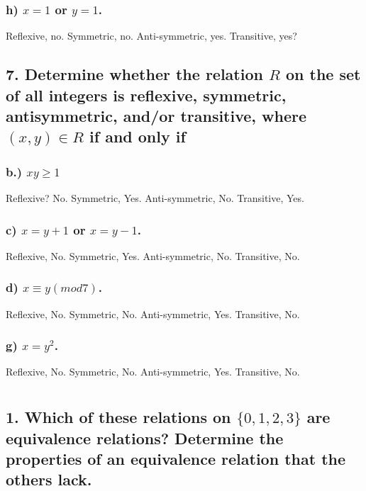 \documentclass[11pt, oneside]{article} %
\numberwithin{equation}{section} %
\numberwithin{figure}{section} %
\numberwithin{table}{section} %
\begin{document}
\subsubsection{h) $x=1$ or $y=1$.}
Reflexive, no. Symmetric, no. Anti-symmetric, yes. Transitive,  yes?

\subsection{7. Determine whether the relation $R$ on the set of all integers is reflexive, symmetric, antisymmetric, and/or transitive, where $(x,y) \in R$ if and only if}
\subsubsection{b.) $xy \geq 1$}
Reflexive? No. Symmetric, Yes. Anti-symmetric, No. Transitive, Yes.
\subsubsection{c) $x=y+1$ or $x=y−1$.}
Reflexive, No. Symmetric, Yes. Anti-symmetric, No. Transitive, No.
\subsubsection{d) $x \equiv y(mod 7)$.}
Reflexive, No. Symmetric, No. Anti-symmetric, Yes. Transitive, No.
\subsubsection{g) $x=y^2$.}
Reflexive, No. Symmetric, No. Anti-symmetric, Yes. Transitive, No.



\section{}
\subsection{1. Which of these relations on $\{0, 1, 2, 3\}$ are equivalence relations? Determine the properties of an equivalence relation that the others lack.}
\end{document}
